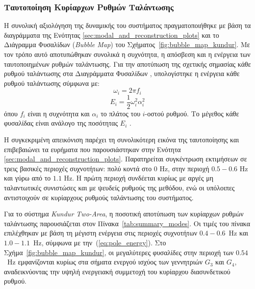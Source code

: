\FloatBarrier
\subsubsection{Ταυτοποίηση Κυρίαρχων Ρυθμών Ταλάντωσης}
\ifkundursystemanalysis
\label{subsec:overall_evaluation}

Η συνολική αξιολόγηση της δυναμικής του συστήματος πραγματοποιήθηκε με βάση τα διαγράμματα της Ενότητας \ref{sec:modal_and_reconstruction_plots} και το Διάγραμμα Φυσαλίδων (\textenglish{\textit{Bubble Map}}) του Σχήματος~\ref{fig:bubble_map_kundur}. Με τον τρόπο αυτό αποτυπώθηκαν συνολικά η συχνότητα, η απόσβεση και η ενέργεια των ταυτοποιημένων ρυθμών ταλάντωσης.
Για την αποτύπωση της σχετικής σημασίας κάθε ρυθμού ταλάντωσης στα Διαγράμματα Φυσαλίδων , υπολογίστηκε η ενέργεια κάθε ρυθμού ταλάντωσης σύμφωνα με:
\begin{equation}
\omega_i = 2\pi f_i
\end{equation}
\begin{equation}
\label{eq:pole_energy}
E_i = \frac{1}{2}\omega_i^2 \alpha_i^2
\end{equation}
όπου $f_i$ είναι η συχνότητα και $\alpha_i$ το πλάτος του $i$-οστού ρυθμού. Το μέγεθος κάθε φυσαλίδας είναι ανάλογο της ποσότητας $E_i$ \cite{sfetkos2024measurement}.

Η συγκεκριμένη απεικόνιση παρέχει τη συνολικότερη εικόνα της ταυτοποίησης και επιβεβαιώνει τα ευρήματα που παρουσιάστηκαν στην Ενότητα \ref{sec:modal_and_reconstruction_plots}. Παρατηρείται συγκέντρωση εκτιμήσεων σε τρεις βασικές περιοχές συχνοτήτων: πολύ κοντά στο $0$ Hz, στην περιοχή $0.5-0.6$ Hz και γύρω από το $1.1$ Hz. Η πρώτη περιοχή συνδέεται κυρίως με αργές μη ταλαντωτικές συνιστώσες και με ψευδείς ρυθμούς της μεθόδου, ενώ οι υπόλοιπες αντιστοιχούν σε κυρίαρχους ρυθμούς ταλάντωσης του συστήματος.

Για το σύστημα \textenglish{\textit{Kundur Two-Area}}, η ποσοτική αποτύπωση των κυρίαρχων ρυθμών ταλάντωσης παρουσιάζεται στον Πίνακα~\ref{tab:summary_modes}. Οι τιμές του πίνακα επιλέχθηκαν με βάση τη μέγιστη ενέργεια στις περιοχές συχνοτήτων $0.4-0.6$~Hz και $1.0-1.1$~Hz, σύμφωνα με την~(\ref{eq:pole_energy}). Στο Σχήμα~\ref{fig:bubble_map_kundur}, οι μεγαλύτερες φυσαλίδες στην περιοχή των $0.54$~Hz εμφανίζονται κυρίως στα σήματα ενεργού ισχύος των γεννητριών $G_3$ και $G_4$, αναδεικνύοντας την υψηλή ενεργειακή συμμετοχή του κυρίαρχου διασυνδετικού ρυθμού.


